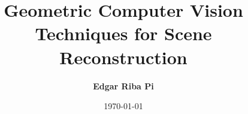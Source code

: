 %
%
%



\title{Geometric Computer Vision Techniques for Scene Reconstruction}
\author{\textbf{Edgar Riba Pi}}
\date{\today}



\frontmatter
%


\setcounter{page}{0}




\tableofcontents
\cleardoublepage
{}
{} %
\listoffigures
\cleardoublepage
{}
{} %
\listoftables


\setlength{\parskip}{0em}


\mainmatter





%
\backmatter



